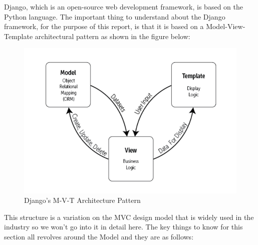 \documentclass[12pt,a4paper]{report}
\begin{document}
Django, which is an open-source web development framework, is based on the Python language\cite{DJ}. The important thing to understand about the Django framework, for the purpose of this report, is that it is based on a Model-View-Template architectural pattern as shown in the figure below:
\begin{figure}[H]
\centering
\includegraphics[scale=1.0]{MVT.png}
\caption{Django's M-V-T Architecture Pattern \cite{DJ2}}
\label{Figure:MVT}
\end{figure} 

This structure is a variation on the MVC design model that is widely used in the industry so we won't go into it in detail here. The key things to know for this section all revolves around the Model and they are as follows:
\end{document}
